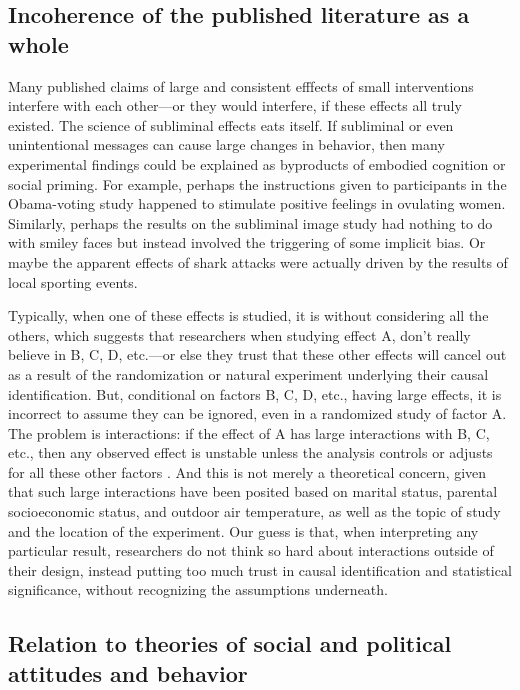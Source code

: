 \documentclass[11pt,letterpaper]{article}
\begin{document}
\subsection{Incoherence of the published literature as a whole}

Many published claims of large and consistent efffects of small interventions
interfere with each other---or they would interfere, if these effects all truly
existed. The science of subliminal effects eats itself. If subliminal or even
unintentional messages can cause large changes in behavior, then many
experimental findings could be explained as byproducts of embodied cognition or
social priming. For example, perhaps the instructions given to participants in
the Obama-voting study happened to stimulate positive feelings in ovulating
women. Similarly, perhaps the results on the subliminal image study had nothing
to do with smiley faces but instead involved the triggering of some implicit
bias. Or maybe the apparent effects of shark attacks were actually driven by the
results of local sporting events.

Typically, when one of these effects is studied, it is without considering all
the others, which suggests that researchers when studying effect A, don't really
believe in B, C, D, etc.---or else they trust that these other effects will
cancel out as a result of the randomization or natural experiment underlying
their causal identification. But, conditional on factors B, C, D, etc., having
large effects, it is incorrect to assume they can be ignored, even in a
randomized study of factor A. The problem is interactions: if the effect of A
has large interactions with B, C, etc., then any observed effect is unstable
unless the analysis controls or adjusts for all these other factors
\citep{tosh2025}. And this is not merely a theoretical concern, given that such
large interactions have been posited based on marital status, parental
socioeconomic status, and outdoor air temperature, as well as the topic of study
and the location of the experiment. Our guess is that, when interpreting any
particular result, researchers do not think so hard about interactions outside
of their design, instead putting too much trust in causal identification and
statistical significance, without recognizing the assumptions underneath.

\subsection{Relation to theories of social and political attitudes and behavior}
\end{document}
